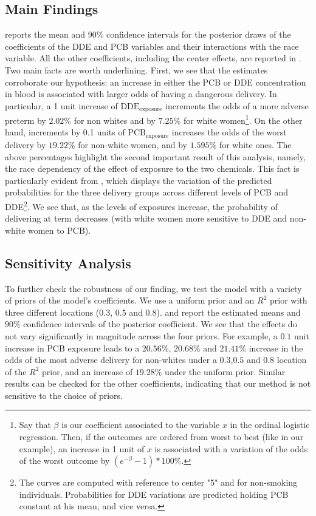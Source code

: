 \documentclass[10pt]{jmlr}%
\begin{document}
\subsection{Main Findings}
 reports the mean and 90\% confidence intervals for the posterior draws of the coefficients of the DDE and PCB variables and their interactions with the race variable. All the other coefficients, including the center effects, are reported in . Two main facts are worth underlining. First, we see that the estimates corroborate our hypothesis: an increase in either the  PCB or DDE concentration in blood is associated with larger odds of having a dangerous delivery. In particular, a 1 unit increase of $\text{DDE}_{\text{exposure}}$ increments the odds of a more adverse preterm by $2.02\%$ for non whites and by $7.25\%$ for white women\footnote{Say that $\beta$ is our coefficient associated to the variable $x$ in the ordinal logistic regression. Then, if the outcomes are ordered from worst to best (like in our example), an increase in 1 unit of $x$ is associated with a variation of the odds of the worst outcome by $(e^{-\beta}-1)*100\%$. }. On the other hand, increments by 0.1 units of $\text{PCB}_{\text{exposure}}$ increases the odds of the worst delivery by $19.22\%$ for non-white women, and by $1.595\%$ for white ones. The above percentages highlight the second important result of this analysis, namely, the race dependency of the effect of exposure to the two chemicals. This fact is particularly evident from , which displays the variation of the predicted probabilities for the three delivery groups across different levels of PCB and DDE\footnote{The curves are computed with reference to center "5" and for non-smoking individuals. Probabilities for DDE variations are predicted holding PCB constant at his mean, and vice versa.}. We see that, as the levels of exposures increase, the probability of delivering at term decreases (with white women more sensitive to DDE and non-white women to PCB).

\subsection{Sensitivity Analysis}
To further check the robustness of our finding, we test the model with a variety of priors of the model's coefficients. We use a uniform prior and an $R^2$ prior with three different locations ($0.3$, $0.5$ and $0.8$).  and  report the estimated means and $90\%$ confidence intervals of the posterior coefficient. We see that the effects do not vary significantly in magnitude across the four priors. For example, a $0.1$ unit increase in PCB exposure leads to a $20.56\%$, $20.68\%$ and $21.41\%$ increase in the odds of the most adverse delivery for non-whites under a $0.3$,$0.5$ and $0.8$ location of the $R^2$ prior, and an increase of $19.28\%$ under the uniform prior. Similar results can be checked for the other coefficients, indicating that our method is not sensitive to the choice of priors.
\end{document}

